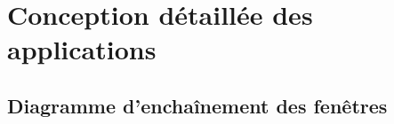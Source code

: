 
\section{Conception détaillée des applications}

\subsection{Diagramme d'enchaînement des fenêtres}

